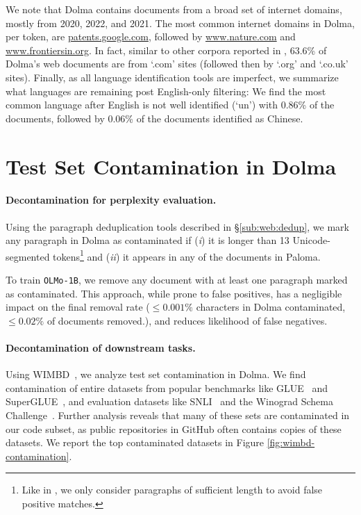 \documentclass{article}
\newcommand{\dolma}{Dolma\xspace}
\newcommand{\OlmoTiny}{\texttt{OLMo-1B}\xspace}
\begin{document}
We note that \dolma contains documents from a broad set of internet domains, mostly from 2020, 2022, and 2021.
The most common internet domains in \dolma, per token, are \url{patents.google.com}, followed by \url{www.nature.com} and \url{www.frontiersin.org}.
In fact, similar to other corpora reported in \citet{wimbd}, 63.6\% of Dolma's web documents are from `.com' sites (followed then by `.org' and `.co.uk' sites).
Finally, as all language identification tools are imperfect, we summarize what languages are remaining post English-only filtering: We find the most common language after English is not well identified (`un') with 0.86\% of the documents, followed by 0.06\% of the documents identified as Chinese.

\section{Test Set Contamination in \dolma}
\label{appendix:sec:decontam-dolma-perplexity-paloma}

\paragraph{Decontamination for perplexity evaluation.}
Using the paragraph deduplication tools described in \S\ref{sub:web:dedup}, 
we mark any paragraph in \dolma as contaminated if (\textit{i}) it is longer than 13 Unicode-segmented tokens\footnote{Like in \citet{wimbd}, we only consider paragraphs of sufficient length to avoid false positive matches.} and (\textit{ii}) it appears in any of the documents in Paloma.

To train \OlmoTiny, we remove any document with at least one paragraph marked as contaminated. 
This approach, while prone to false positives, has a negligible  impact on the final removal rate ($\leq 0.001\%$ characters in \dolma contaminated, $\leq 0.02\%$ of documents removed.), and reduces likelihood of false negatives.

\paragraph{Decontamination of downstream tasks.} 
Using WIMBD~\cite{wimbd}, we analyze test set contamination in \dolma.
We find contamination of entire datasets from popular benchmarks like 
GLUE~\citep{wang-etal-2018-glue} and SuperGLUE~\citep{wang2019superglue}, and evaluation datasets like SNLI~\citep{bowman-etal-2015-large} and the Winograd Schema Challenge~\citep{wsc}.
Further analysis reveals that many of these sets are contaminated in our code subset, as public repositories in GitHub often contains copies of these datasets.
We report the top contaminated datasets in Figure \ref{fig:wimbd-contamination}.
\end{document}
